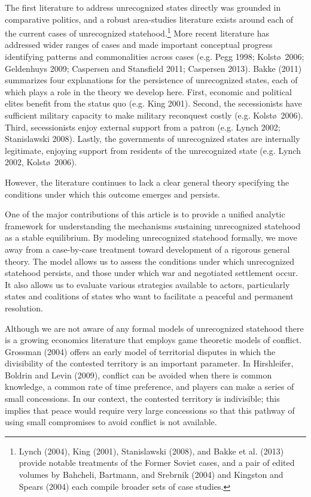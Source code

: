 \documentclass[11pt,letterpaper, notitlepage]{article}
\begin{document}
The first literature to address unrecognized states directly was grounded in comparative politics, and a robust area-studies literature exists around each of the current cases of unrecognized statehood.\footnote{Lynch (2004), King (2001), Stanislawski (2008), and Bakke et al. (2013) provide notable treatments of the Former Soviet cases, and a pair of edited volumes by Bahcheli, Bartmann, and Srebrnik (2004) and Kingston and Spears (2004) each compile broader sets of case studies.} More recent literature has addressed wider ranges of cases and made important conceptual progress identifying patterns and commonalities across cases (e.g. Pegg 1998; Kolst\o \ 2006; Geldenhuys 2009; Caspersen and Stansfield 2011; Caspersen 2013). Bakke (2011) summarizes four explanations for the persistence of unrecognized states, each of which plays a role in the theory we develop here. First, economic and political elites benefit from the status quo (e.g. King 2001). Second, the secessionists have sufficient military capacity to make military reconquest costly (e.g. Kolst\o \ 2006). Third, secessionists enjoy external support from a patron (e.g. Lynch 2002; Stanislawski 2008). Lastly, the governments of unrecognized states are internally legitimate, enjoying support from residents of the unrecognized state (e.g. Lynch 2002, Kolst\o \ 2006).

However, the literature continues to lack a clear general theory specifying the conditions under which this outcome emerges and persists. 

One of the major contributions of this article is to provide a unified analytic framework for understanding the mechanisms sustaining unrecognized statehood as a stable equilibrium. By modeling unrecognized statehood formally, we move away from a case-by-case treatment toward development of a rigorous general theory. The model allows us to assess the conditions under which unrecognized statehood persists, and those under which war and negotiated settlement occur. It also allows us to evaluate various strategies available to actors, particularly states and coalitions of states who want to facilitate a peaceful and permanent resolution.

Although we are not aware of any formal models of unrecognized statehood there is a growing economics literature that employs game theoretic models of conflict. Grossman (2004) offers an early model of territorial disputes in which the divisibility of the contested territory is an important parameter. In Hirshleifer, Boldrin and Levin (2009), conflict can be avoided when there is common knowledge, a common rate of time preference, and players can make a series of small concessions. In our context, the contested territory is indivisible; this implies that peace would require very large concessions so that this pathway of using small compromises to avoid conflict is not available.
\end{document}
